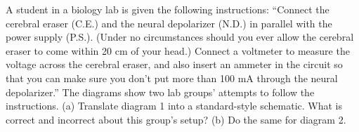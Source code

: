 A student in a biology lab is given the following
        instructions: ``Connect the cerebral eraser (C.E.) and the
        neural depolarizer (N.D.) in parallel with the power supply
        (P.S.).  (Under no circumstances should you ever allow the
        cerebral eraser to come within 20 cm of your head.)  Connect
        a voltmeter to measure the voltage across the cerebral
        eraser, and also insert an ammeter in the circuit so that
        you can make sure you don't put more than 100 mA through the
        neural depolarizer.''  The diagrams show two lab groups'
        attempts to follow the instructions.  \hwendpart
        (a) Translate diagram
        1 into a standard-style schematic. What is correct and
        incorrect about this group's setup?  \hwendpart
        (b) Do the same for diagram 2.

